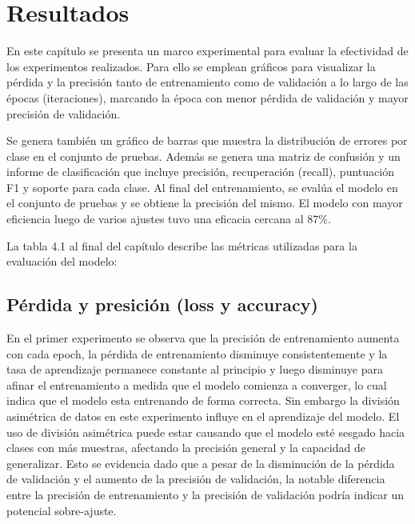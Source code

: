 \chapter{Resultados}\label{chapter:results}
En este capítulo se presenta un marco experimental para evaluar la efectividad de los experimentos realizados. Para ello se emplean gráficos para visualizar la pérdida y la precisión tanto de entrenamiento como de validación a lo largo de las épocas (iteraciones), marcando la época con menor pérdida de validación y mayor precisión de validación.

Se genera también un gráfico de barras que muestra la distribución de errores por clase en el conjunto de pruebas. Además se genera una matriz de confusión y un informe de clasificación que incluye precisión, recuperación (recall), puntuación F1 y soporte para cada clase. Al final del entrenamiento, se evalúa el modelo en el conjunto de pruebas y se obtiene la precisión del mismo. El modelo con mayor eficiencia luego de varios ajustes tuvo una eficacia cercana al 87\%.

La tabla 4.1 al final del capítulo describe las métricas utilizadas para la evaluación del modelo:

\section*{Pérdida y presición (loss y accuracy)}


En el primer experimento se observa que la precisión de entrenamiento aumenta con cada epoch, la pérdida de entrenamiento disminuye consistentemente y la tasa de aprendizaje permanece constante al principio y luego disminuye para afinar el entrenamiento a medida que el modelo comienza a converger, lo cual indica que el modelo esta entrenando de forma correcta. Sin embargo la división asimétrica de datos en este experimento influye en el aprendizaje del modelo. El uso de división asimétrica puede estar causando que el modelo esté sesgado hacia clases con más muestras, afectando la precisión general y la capacidad de generalizar. Esto se evidencia dado que a pesar de la disminución de la pérdida de validación y el aumento de la precisión de validación, la notable diferencia entre la precisión de entrenamiento y la precisión de validación podría indicar un potencial sobre-ajuste.

